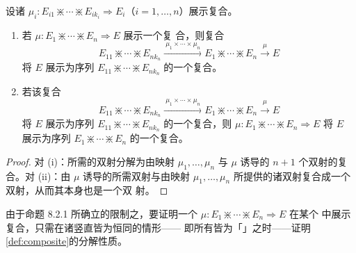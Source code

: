 \begin{lemma}\label{lem:composite-associativity}
设诸\trCell{} $\mu_{i}\colon E_{i1}\divideontimes\cdots\divideontimes E_{ik_{i}}\Rightarrow E_{i}$（$i=1,\ldots,n$）展示复合。

\begin{enumerate}[label=(\roman*)]
\item 若 $\mu\colon E_{1}\divideontimes\cdots\divideontimes E_{n}\Rightarrow E$ 展示一个复
合，则复合\trCell
\begin{equation*}
E_{11}\divideontimes\cdots\divideontimes E_{nk_{n}}
\xrightarrow{\ \mu_{1}\times\cdots\times\mu_{n}\ }
E_{1}\divideontimes\cdots\divideontimes E_{n}
\xrightarrow{\ \mu\ }
E
\end{equation*}
将 $E$ 展示为序列 $E_{11}\divideontimes\cdots\divideontimes E_{nk_{n}}$ 的一个复合。
\item 若该复合\trCell
\begin{equation*}
E_{11}\divideontimes\cdots\divideontimes E_{nk_{n}}
\xrightarrow{\ \mu_{1}\times\cdots\times\mu_{n}\ }
E_{1}\divideontimes\cdots\divideontimes E_{n}
\xrightarrow{\ \mu\ }
E
\end{equation*}
将 $E$ 展示为序列 $E_{11}\divideontimes\cdots\divideontimes E_{nk_{n}}$ 的一个复合，则
$\mu\colon E_{1}\divideontimes\cdots\divideontimes E_{n}\Rightarrow E$ 将 $E$ 展示为序列
$E_{1}\divideontimes\cdots\divideontimes E_{n}$ 的一个复合。
\end{enumerate}
\end{lemma}

\begin{proof}
对 (i)：所需的双射分解为由映射 $\mu_{1},\ldots,\mu_{n}$ 与 $\mu$ 诱导的
$n+1$ 个双射的复合。对 (ii)：由 $\mu$ 诱导的所需双射与由映射
$\mu_{1},\ldots,\mu_{n}$ 所提供的诸双射复合成一个双射，从而其本身也是一个双
射。
\end{proof}

\begin{remark}\label{rem:fibered-cells-suffice}
由于命题 8.2.1 所确立的限制之\trUniversalProperty，要证明一个\trCell{}
$\mu\colon E_{1}\divideontimes\cdots\divideontimes E_{n}\Rightarrow E$ 在某个%
\trVirtualEquipment{}中展示复合，只需在诸竖直\trFunctor{}皆为恒同的情形——
即所有\trCell{}皆为「\trFibered」之时——证明\cref{def:composite}的分解性质。
\end{remark}

